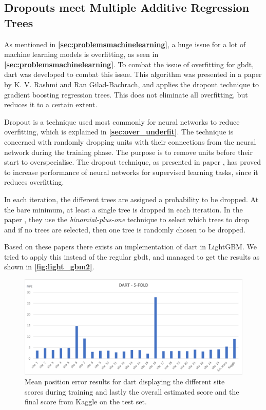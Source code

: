 \subsection{Dropouts meet Multiple Additive Regression Trees}

As mentioned in \textbf{\autoref{sec:problemsmachinelearning}}, a huge issue for a lot of machine learning models is overfitting, as seen in \textbf{\autoref{sec:problemsmachinelearning}}. To combat the issue of overfitting for \gls{gbdt}, \gls{dart} was developed to combat this issue. This algorithm was presented in a paper \cite{dart} by K. V. Rashmi and Ran Gilad-Bachrach, and applies the dropout technique to gradient boosting regression trees. This does not eliminate all overfitting, but reduces it to a certain extent.\cite{dart}

Dropout is a technique used most commonly for neural networks to reduce overfitting, which is explained in \textbf{\autoref{sec:over_underfit}}. The technique is concerned with randomly dropping units with their connections from the neural network during the training phase. The purpose is to remove units before their start to overspecialise. The dropout technique, as presented in paper \cite{dropout}, has proved to increase performance of neural networks for supervised learning tasks, since it reduces overfitting.

In each iteration, the different trees are assigned a probability to be dropped. At the bare minimum, at least a single tree is dropped in each iteration. In the paper \cite{dart}, they use the \textit{binomial-plus-one} technique to select which trees to drop and if no trees are selected, then one tree is randomly chosen to be dropped.

Based on these papers there exists an implementation of \gls{dart} in LightGBM. We tried to apply this instead of the regular \gls{gbdt}, and managed to get the results as shown in \textbf{\autoref{fig:light_gbm2}}.

\begin{figure}[H]
    \centering
    \includegraphics[scale=0.6]{Images/Experiments/lightgbm/DART_5.png}
    \caption{Mean position error results for \gls{dart} displaying the different site scores during training and lastly the overall estimated score and the final score from Kaggle on the test set.}
    \label{fig:light_gbm2}
\end{figure}

